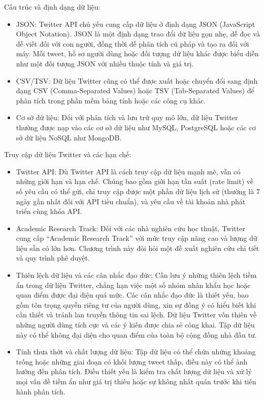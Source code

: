 Cấu trúc và định dạng dữ liệu:

\begin{itemize}
  \item JSON: Twitter API chủ yếu cung cấp dữ liệu ở định dạng JSON (JavaScript Object Notation). JSON là một định dạng trao đổi dữ liệu gọn nhẹ, dễ đọc và dễ viết đối với con người, đồng thời dễ phân tích cú pháp và tạo ra đối với máy. Mỗi tweet, hồ sơ người dùng hoặc đối tượng dữ liệu khác được biểu diễn như một đối tượng JSON với nhiều thuộc tính và giá trị.
  \item CSV/TSV: Dữ liệu Twitter cũng có thể được xuất hoặc chuyển đổi sang định dạng CSV (Comma-Separated Values) hoặc TSV (Tab-Separated Values) để phân tích trong phần mềm bảng tính hoặc các công cụ khác.
  \item Cơ sở dữ liệu: Đối với phân tích và lưu trữ quy mô lớn, dữ liệu Twitter thường được nạp vào các cơ sở dữ liệu như MySQL, PostgreSQL hoặc các cơ sở dữ liệu NoSQL như MongoDB.
\end{itemize}

Truy cập dữ liệu Twitter và các hạn chế:

\begin{itemize}
  \item Twitter API: Dù Twitter API là cách truy cập dữ liệu mạnh mẽ, vẫn có những giới hạn và hạn chế. Chúng bao gồm giới hạn tần suất (rate limit) về số yêu cầu có thể gửi, chỉ truy cập được một phần dữ liệu lịch sử (thường là 7 ngày gần nhất đối với API tiêu chuẩn), và yêu cầu về tài khoản nhà phát triển cùng khóa API.
  \item Academic Research Track: Đối với các nhà nghiên cứu học thuật, Twitter cung cấp ``Academic Research Track'' với mức truy cập nâng cao và lượng dữ liệu sẵn có lớn hơn. Chương trình này đòi hỏi một đề xuất nghiên cứu chi tiết và quy trình phê duyệt.
  \item Thiên lệch dữ liệu và các cân nhắc đạo đức: Cần lưu ý những thiên lệch tiềm ẩn trong dữ liệu Twitter, chẳng hạn việc một số nhóm nhân khẩu học hoặc quan điểm được đại diện quá mức. Các cân nhắc đạo đức là thiết yếu, bao gồm tôn trọng quyền riêng tư của người dùng, xin sự đồng ý có hiểu biết khi cần thiết và tránh lan truyền thông tin sai lệch. Dữ liệu Twitter vốn thiên về những người dùng tích cực và các ý kiến được chia sẻ công khai. Tập dữ liệu này có thể không đại diện cho quan điểm của toàn bộ cộng đồng nhà đầu tư.
  \item Tính thưa thớt và chất lượng dữ liệu: Tập dữ liệu có thể chứa những khoảng trống hoặc những giai đoạn có khối lượng tweet thấp, điều này có thể ảnh hưởng đến phân tích. Điều thiết yếu là kiểm tra chất lượng dữ liệu và xử lý mọi vấn đề tiềm ẩn như giá trị thiếu hoặc sự không nhất quán trước khi tiến hành phân tích.
\end{itemize}


